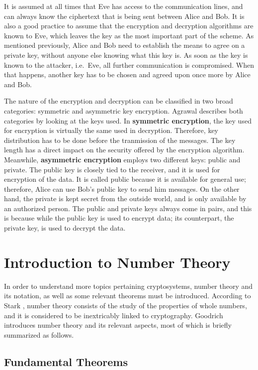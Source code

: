 It is assumed at all times that Eve has access to the communication lines, and can always know the ciphertext that is being sent between Alice and Bob. It is also a good practice to assume that the encryption and decryption algorithms are known to Eve, which leaves the key as the most important part of the scheme. As mentioned previously, Alice and Bob need to establish the means to agree on a private key, without anyone else knowing what this key is. As soon as the key is known to the attacker, i.e.\ Eve, all further communication is compromised. When that happens, another key has to be chosen and agreed upon once more by Alice and Bob.

The nature of the encryption and decryption can be classified in two broad categories: symmetric and asymmetric key encryption. Agrawal \cite{CryptoKeys} describes both categories by looking at the keys used. In \textbf{symmetric encryption}, the key used for encryption is virtually the same used in decryption. Therefore, key distribution has to be done before the tranmission of the messages. The key length has a direct impact on the security offered by the encryption algorithm. Meanwhile, \textbf{asymmetric encryption} employs two different keys: public and private. The public key is closely tied to the receiver, and it is used for encryption of the data. It is called public because it is available for general use; therefore, Alice can use Bob's public key to send him messages. On the other hand, the private is kept secret from the outside world, and is only available by an authorized person. The public and private keys always come in pairs, and this is because while the public key is used to encrypt data; its counterpart, the private key, is used to decrypt the data. 

\section{Introduction to Number Theory}

In order to understand more topics pertaining cryptosystems, number theory and its notation, as well as some relevant theorems must be introduced. According to Stark \cite{stark1970introduction}, number theory consists of the study of the properties of whole numbers, and it is considered to be inextricably linked to cryptography. Goodrich \cite{2008algorithm} introduces number theory and its relevant aspects, most of which is briefly summarized as follows.

\subsection{Fundamental Theorems}

